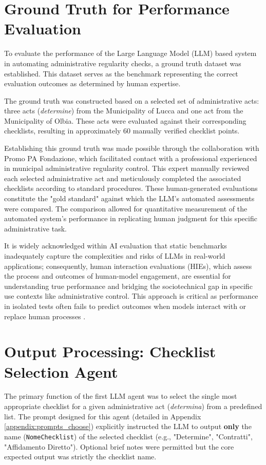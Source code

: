 \documentclass[../main.tex]{subfiles}
\begin{document}
\section{Ground Truth for Performance Evaluation}
\label{sec:ground_truth}
To evaluate the performance of the Large Language Model (LLM) based system in automating administrative regularity checks, a ground truth dataset was established. This dataset serves as the benchmark representing the correct evaluation outcomes as determined by human expertise.

The ground truth was constructed based on a selected set of administrative acts: three acts (\textit{determine}) from the Municipality of Lucca and one act from the Municipality of Olbia. These acts were evaluated against their corresponding checklists, resulting in approximately 60 manually verified checklist points.

Establishing this ground truth was made possible through the collaboration with Promo PA Fondazione, which facilitated contact with a professional experienced in municipal administrative regularity control. This expert manually reviewed each selected administrative act and meticulously completed the associated checklists according to standard procedures. These human-generated evaluations constitute the "gold standard" against which the LLM's automated assessments were compared. The comparison allowed for quantitative measurement of the automated system's performance in replicating human judgment for this specific administrative task.

It is widely acknowledged within AI evaluation that static benchmarks inadequately capture the complexities and risks of LLMs in real-world applications; consequently, human interaction evaluations (HIEs), which assess the process and outcomes of human-model engagement, are essential for understanding true performance and bridging the sociotechnical gap in specific use contexts like administrative control. This approach is critical as performance in isolated tests often fails to predict outcomes when models interact with or replace human processes \cite{ibrahimStaticAIEvaluations2024}.


\section{Output Processing: Checklist Selection Agent}
\label{sec:output_choose_agent}
The primary function of the first LLM agent was to select the single most appropriate checklist for a given administrative act (\textit{determina}) from a predefined list. The prompt designed for this agent (detailed in Appendix \ref{appendix:prompts_choose}) explicitly instructed the LLM to output \textbf{only} the name (\texttt{NomeChecklist}) of the selected checklist (e.g., "Determine", "Contratti", "Affidamento Diretto"). Optional brief notes were permitted but the core expected output was strictly the checklist name.
\end{document}
